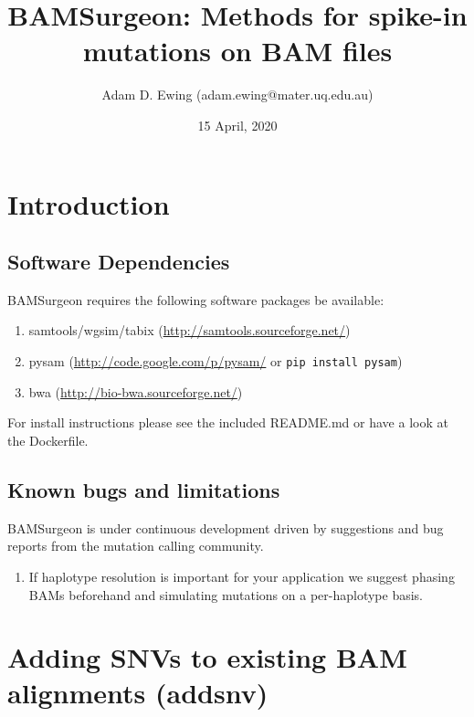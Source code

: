 \documentclass[letterpaper,11pt]{article}
\title{BAMSurgeon: Methods for spike-in mutations on BAM files}
\author{Adam D. Ewing (adam.ewing@mater.uq.edu.au)}
\begin{document}
 \date{15 April, 2020}
 \maketitle

\section{Introduction}
\subsection{Software Dependencies}
BAMSurgeon requires the following software packages be available:

\begin{enumerate}
  \item samtools/wgsim/tabix (\url{http://samtools.sourceforge.net/})
  \item pysam (\url{http://code.google.com/p/pysam/} or \texttt{pip install pysam})
  \item bwa (\url{http://bio-bwa.sourceforge.net/})
\end{enumerate}

For install instructions please see the included README.md or have a look at the Dockerfile.


\subsection{Known bugs and limitations}
BAMSurgeon is under continuous development driven by suggestions and bug reports from the mutation calling community.

\begin{enumerate}
\item If haplotype resolution is important for your application we suggest phasing BAMs beforehand and simulating mutations on a per-haplotype basis.
\end{enumerate}



\section{Adding SNVs to existing BAM alignments (addsnv)}
\end{document}
